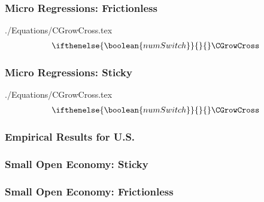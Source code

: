 \documentclass{beamer}\usepackage{dcolumn}
\providecommand{\ifnumSw}{\ifthenelse{\boolean{numSwitch}}{}{\nonumber}}
\providecommand{\econtexRoot}{.}
\providecommand{\eq}{\econtexRoot/Equations}
\begin{document}
\begin{frame}
\frametitle{Micro Regressions: Frictionless}
 \eq/CGrowCross.tex
\small
\begin{eqnarray}
\ifnumSw\CGrowCross    \label{eq:CGrowCross}     \nonumber
\end{eqnarray}


\normalsize

\end{frame}

\begin{frame}
\frametitle{Micro Regressions: Sticky}
 \eq/CGrowCross.tex
\small
\begin{eqnarray}
\ifnumSw\CGrowCross    \label{eq:CGrowCross}     \nonumber
\end{eqnarray}


\normalsize
\end{frame}


\begin{frame}
\frametitle{Empirical Results for U.S.}


\footnotesize


\normalsize
\end{frame}



\begin{frame}
\frametitle{Small Open Economy: Sticky}

\scriptsize


\end{frame}



\begin{frame}
\frametitle{Small Open Economy: Frictionless}

\scriptsize


\end{frame}
\end{document}
